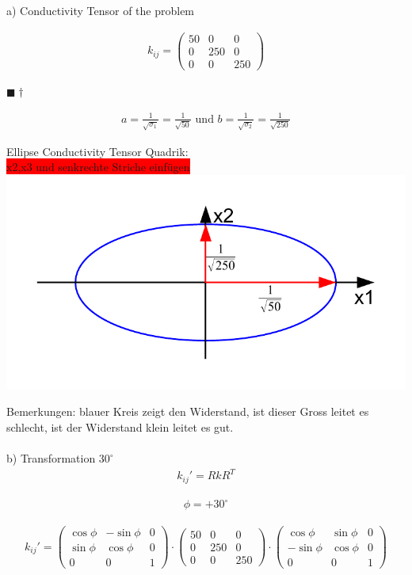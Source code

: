 \documentclass[a4paper]{scrartcl}
\newcommand{\qed}{\begin{flushright}
$\blacksquare \dagger$ \end{flushright}}
\begin{document}
a) Conductivity Tensor of the problem

\begin{align}
k_{ij}=\begin{pmatrix}
50 & 0 & 0 \\
0 & 250 & 0 \\
0 & 0 & 250 
\end{pmatrix}
\end{align}
\qed
\begin{align}
a = \frac{1}{\sqrt{\sigma_1}} = \frac{1}{\sqrt{50}} \text{ und } b =
\frac{1}{\sqrt{\sigma_2}} = \frac{1}{\sqrt{250}}
\end{align}

\begin{center}
Ellipse Conductivity Tensor Quadrik:\\
\colorbox{red}{x2,x3 und senkrechte Striche einfügen}
\includegraphics[scale=0.8]{images/quadrik_2d_ellipse_uebung.pdf}
\end{center}
Bemerkungen: blauer Kreis zeigt den Widerstand, ist dieser Gross leitet es schlecht, ist der Widerstand klein leitet es gut.
\\
\\
b) Transformation $30^\circ$
\begin{align}
k_{ij}'=RkR^{T}
\end{align}

\begin{align}
\phi=+30^\circ
\end{align}

\begin{align}
k_{ij}'=\begin{pmatrix}
\cos{\phi} & -\sin{\phi} & 0 \\
\sin{\phi} & \cos{\phi} & 0 \\
0 & 0 & 1
\end{pmatrix}
\cdot
\begin{pmatrix}
50 & 0 & 0 \\
0 & 250 & 0 \\
0 & 0 & 250 
\end{pmatrix}
\cdot
\begin{pmatrix}
\cos{\phi} & \sin{\phi} & 0 \\
-\sin{\phi} & \cos{\phi} & 0 \\
0 & 0 & 1
\end{pmatrix}
\end{align}
\end{document}
